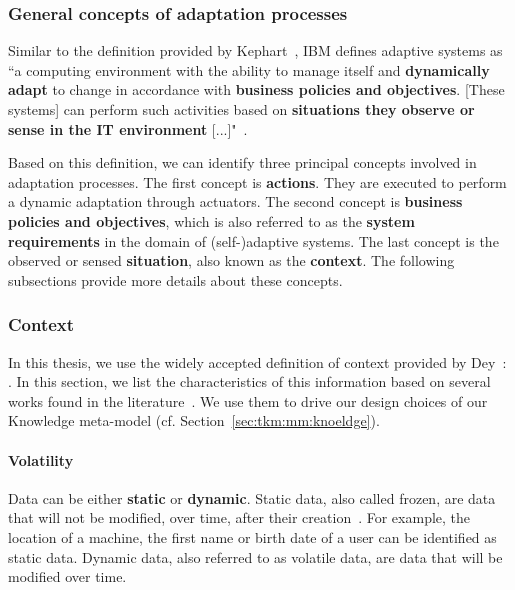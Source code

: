 \subsubsection{General concepts of adaptation processes}

Similar to the definition provided by Kephart~\cite{DBLP:journals/computer/KephartC03}, IBM  defines adaptive systems as ``a computing environment with the ability to manage itself and \textbf{dynamically adapt} to change in accordance with \textbf{business policies and objectives}. [These systems] can perform such activities based on \textbf{situations they observe or sense in the IT environment} [...]"~\cite{computing2006architectural}.

Based on this definition, we can identify three principal concepts involved in adaptation processes.
The first concept is \textbf{actions}. 
They are executed to perform a dynamic adaptation through actuators.
The second concept is \textbf{business policies and objectives}, which is also referred to as the \textbf{system requirements} in the domain of (self-)adaptive systems.
The last concept is the observed or sensed \textbf{situation}, also known as the \textbf{context}.
The following subsections provide more details about these concepts.

\subsubsection{Context}

In this thesis, we use the widely accepted definition of context provided by \linebreak Dey~\cite{DBLP:journals/puc/Dey01}: .
In this section, we list the characteristics of this information based on several works found in the literature~\cite{DBLP:conf/pervasive/HenricksenIR02, DBLP:conf/seke/0001FNMKT14, DBLP:journals/percom/BettiniBHINRR10, DBLP:journals/comsur/PereraZCG14}.
We use them to drive our design choices of our Knowledge meta-model (cf. Section~\ref{sec:tkm:mm:knoeldge}).

\paragraph{Volatility}
Data can be either \textbf{static} or \textbf{dynamic}.
Static data, also called frozen, are data that will not be modified, over time, after their creation~\cite{DBLP:conf/pervasive/HenricksenIR02, DBLP:journals/comsur/MakrisSS13, DBLP:journals/percom/BettiniBHINRR10}.
For example, the location of a machine, the first name or birth date of a user can be identified as static data. 
Dynamic data, also referred to as volatile data, are data that will be modified over time.

